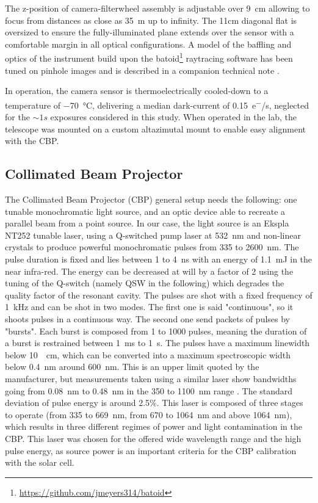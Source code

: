 The z-position of camera-filterwheel assembly is adjustable over
\SI{9}{\centi\meter} allowing to focus from distances as close as
\SI{35}{m} up to infinity. The 11cm diagonal flat is oversized to
ensure the fully-illuminated plane extends over the sensor with a
comfortable margin in all optical configurations. A model of the
baffling and optics of the instrument build upon the
batoid\footnote{\url{https://github.com/jmeyers314/batoid}} raytracing
software has been tuned on pinhole images and is described in a
companion technical note \cite{}.

In operation, the camera sensor is thermoelectrically cooled-down to a
temperature of \SI{-70}{\celsius}, delivering a median dark-current of
\SI{0.15}{e^-/s}, neglected for the $\sim 1s$ exposures considered in
this study. When operated in the lab, the telescope was mounted on a
custom altazimutal mount to enable easy alignment with the CBP.

\subsection{Collimated Beam Projector}
\label{sec:cbp}

The Collimated Beam Projector (CBP) general setup needs the following: one tunable monochromatic light source, and an optic device able to recreate a parallel beam from a point source. 
In our case, the light source is an Ekspla NT252 tunable laser, using a Q-switched pump laser at \SI{532}{\nano\meter} and non-linear crystals to produce powerful monochromatic pulses from 335 to \SI{2600}{\nano\meter}. The pulse duration is fixed and lies between 1 to \SI{4}{\nano\second} with an energy of \SI{1.1}{\milli\joule} in the near infra-red. The energy can be decreased at will by a factor of 2 using the tuning of the Q-switch (namely QSW in the following) which degrades the quality factor of the resonant cavity. The pulses are shot with a fixed frequency of \SI{1}{\kilo\hertz} and can be shot in two modes. The first one is said "continuous", so it shoots pulses in a continuous way. The second one send packets of pulses by "bursts". Each burst is composed from 1 to 1000 pulses, meaning the duration of a burst is restrained between \SI{1}{\milli\second} to \SI{1}{\second}. The pulses have a maximum linewidth below \SI{10}{\per\cm}, which can be converted into a maximum spectroscopic width below \SI{0.4}{\nano\meter} around \SI{600}{\nano\meter}. This is an upper limit quoted by the manufacturer, but measurements taken using a similar laser show bandwidths going from \SI{0.08}{\nm} to \SI{0.48}{\nm} in the 350 to \SI{1100}{\nm} range \citep{woodward2018}. The standard deviation of pulse energy is around 2.5\%. This laser is composed of three stages to operate (from 335 to \SI{669}{\nano\meter}, from 670 to \SI{1064}{\nano\meter} and above \SI{1064}{\nano\meter}), which results in three different regimes of power and light contamination in the CBP. This laser was chosen for the offered wide wavelength range and the high pulse energy, as source power is an important criteria for the CBP calibration with the solar cell. 

